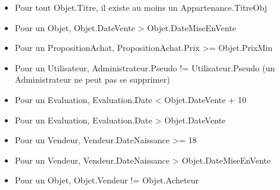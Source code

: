 \documentclass[a4paper,11pt]{article}
\begin{document}
\begin{itemize}
\item Pour tout Objet.Titre, il existe au moins un Appartenance.TitreObj
\item Pour un Objet, Objet.DateVente > Objet.DateMiseEnVente
\item Pour un PropositionAchat, PropositionAchat.Prix >= Objet.PrixMin
\item Pour un Utilisateur, Administrateur.Pseudo != Utilisateur.Pseudo (un Administrateur ne peut pas se supprimer)
\item Pour un Evaluation, Evaluation.Date < Objet.DateVente + 10
\item Pour un Evaluation, Evaluation.Date > Objet.DateVente
\item Pour un Vendeur, Vendeur.DateNaissance >= 18
\item Pour un Vendeur, Vendeur.DateNaissance > Objet.DateMiseEnVente
\item Pour un Objet, Objet.Vendeur != Objet.Acheteur
\end{itemize}
\end{document}
